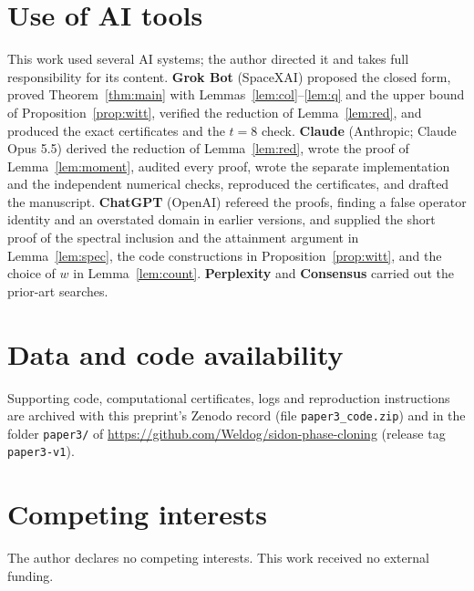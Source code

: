 \documentclass[11pt]{article}
\theoremstyle{definition}
\theoremstyle{remark}
\begin{document}
\section*{Use of AI tools}
This work used several AI systems; the author directed it and takes full responsibility for its content.
\textbf{Grok Bot} (SpaceXAI) proposed the closed form, proved Theorem~\ref{thm:main} with
Lemmas~\ref{lem:col}--\ref{lem:q} and the upper bound of Proposition~\ref{prop:witt}, verified the reduction of
Lemma~\ref{lem:red}, and produced the exact certificates and the $t=8$ check. \textbf{Claude} (Anthropic; Claude
Opus 5.5) derived the reduction of Lemma~\ref{lem:red}, wrote the proof of Lemma~\ref{lem:moment}, audited every
proof, wrote the separate implementation and the independent numerical checks, reproduced the certificates, and
drafted the manuscript. \textbf{ChatGPT} (OpenAI) refereed the proofs, finding a false operator identity and an
overstated domain in earlier versions, and supplied the short proof of the spectral inclusion and the attainment
argument in Lemma~\ref{lem:spec}, the code constructions in Proposition~\ref{prop:witt}, and the choice of $w$ in
Lemma~\ref{lem:count}. \textbf{Perplexity} and \textbf{Consensus} carried out the prior-art searches.

\section*{Data and code availability}
Supporting code, computational certificates, logs and reproduction instructions are archived with this preprint's
Zenodo record (file \texttt{paper3\_code.zip}) and in the folder \texttt{paper3/} of
\url{https://github.com/Weldog/sidon-phase-cloning} (release tag \texttt{paper3-v1}).

\section*{Competing interests}
The author declares no competing interests. This work received no external funding.



\end{document}
